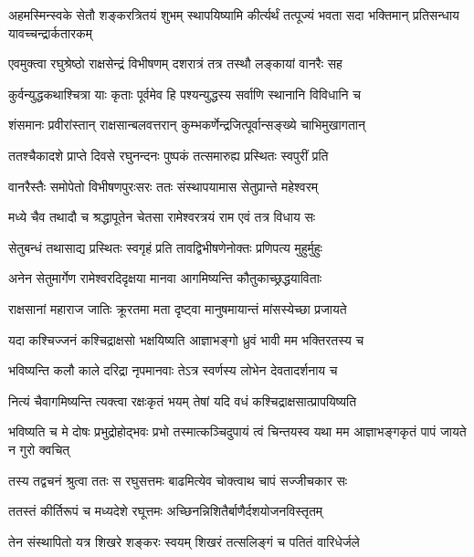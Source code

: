 \threelineshloka
{अहमस्मिन्स्वके सेतौ शङ्करत्रितयं शुभम्}
{स्थापयिष्यामि कीर्त्यर्थं तत्पूज्यं भवता सदा}
{भक्तिमान् प्रतिसन्धाय यावच्चन्द्रार्कतारकम्}%

\twolineshloka
{एवमुक्त्वा रघुश्रेष्ठो राक्षसेन्द्रं विभीषणम्}
{दशरात्रं तत्र तस्थौ लङ्कायां वानरैः सह}%

\twolineshloka
{कुर्वन्युद्धकथाश्चित्रा याः कृताः पूर्वमेव हि}
{पश्यन्युद्धस्य सर्वाणि स्थानानि विविधानि च}%

\twolineshloka
{शंसमानः प्रवीरांस्तान् राक्षसान्बलवत्तरान्}
{कुम्भकर्णेन्द्रजित्पूर्वान्सङ्ख्ये चाभिमुखागतान्}%

\twolineshloka
{ततश्चैकादशे प्राप्ते दिवसे रघुनन्दनः}
{पुष्पकं तत्समारुह्य प्रस्थितः स्वपुरीं प्रति}%

\twolineshloka
{वानरैस्तैः समोपेतो विभीषणपुरःसरः}
{ततः संस्थापयामास सेतुप्रान्ते महेश्वरम्}%

\twolineshloka
{मध्ये चैव तथादौ च श्रद्धापूतेन चेतसा}
{रामेश्वरत्रयं राम एवं तत्र विधाय सः}%

\twolineshloka
{सेतुबन्धं तथासाद्य प्रस्थितः स्वगृहं प्रति}
{तावद्विभीषणेनोक्तः प्रणिपत्य मुहुर्मुहुः}%


\twolineshloka
{अनेन सेतुमार्गेण रामेश्वरदिदृक्षया}
{मानवा आगमिष्यन्ति कौतुकाच्छ्रद्धयाविताः}%

\twolineshloka
{राक्षसानां महाराज जातिः क्रूरतमा मता}
{दृष्ट्वा मानुषमायान्तं मांसस्येच्छा प्रजायते}%

\twolineshloka
{यदा कश्चिज्जनं कश्चिद्राक्षसो भक्षयिष्यति}
{आज्ञाभङ्गो ध्रुवं भावी मम भक्तिरतस्य च}%

\twolineshloka
{भविष्यन्ति कलौ काले दरिद्रा नृपमानवाः}
{तेऽत्र स्वर्णस्य लोभेन देवतादर्शनाय च}%

\twolineshloka
{नित्यं चैवागमिष्यन्ति त्यक्त्वा रक्षःकृतं भयम्}
{तेषां यदि वधं कश्चिद्राक्षसात्प्रापयिष्यति}%

\threelineshloka
{भविष्यति च मे दोषः प्रभुद्रोहोद्भवः प्रभो}
{तस्मात्कञ्चिदुपायं त्वं चिन्तयस्व यथा मम}
{आज्ञाभङ्गकृतं पापं जायते न गुरो क्वचित्}%

\twolineshloka
{तस्य तद्वचनं श्रुत्वा ततः स रघुसत्तमः}
{बाढमित्येव चोक्त्वाथ चापं सज्जीचकार सः}%

\twolineshloka
{ततस्तं कीर्तिरूपं च मध्यदेशे रघूत्तमः}
{अच्छिनन्निशितैर्बाणैर्दशयोजनविस्तृतम्}%

\twolineshloka
{तेन संस्थापितो यत्र शिखरे शङ्करः स्वयम्}
{शिखरं तत्सलिङ्गं च पतितं वारिधेर्जले}%


